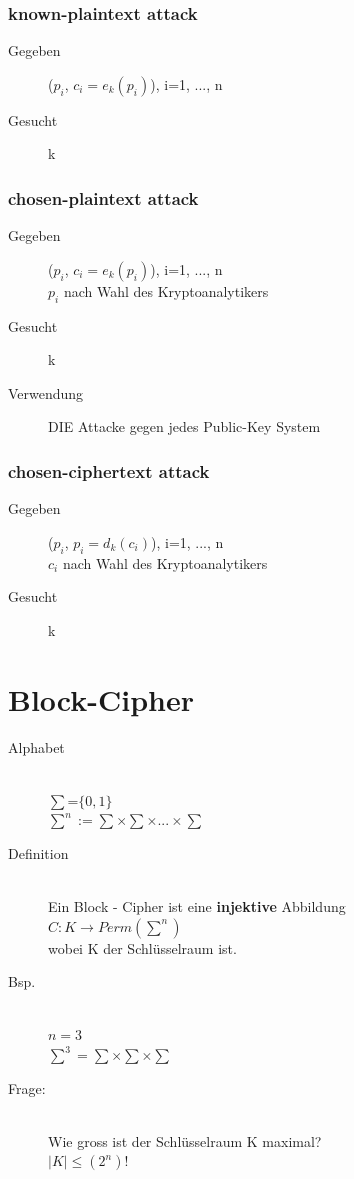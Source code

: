 \documentclass[10pt]{article}
\newcommand{\ra}{\rightarrow}
\begin{document}
\subsubsection{known-plaintext attack}
\begin{description}
	\item[Gegeben] ($p_i$, $c_i=e_k(p_i)$), i=1, ..., n
	\item[Gesucht] k
\end{description}

\subsubsection{chosen-plaintext attack}
\begin{description}
	\item[Gegeben] ($p_i$, $c_i=e_k(p_i)$), i=1, ..., n \\
		$p_i$ nach Wahl des Kryptoanalytikers
	\item[Gesucht] k
	\item[Verwendung] DIE Attacke gegen jedes Public-Key System
\end{description}

\subsubsection{chosen-ciphertext attack}
\begin{description}
	\item[Gegeben] ($p_i$, $p_i=d_k(c_i)$), i=1, ..., n \\
		$c_i$ nach Wahl des Kryptoanalytikers
	\item[Gesucht] k
\end{description}

\newpage
\section{Block-Cipher}
\begin{description}
	\item[Alphabet] \hfill \\
		$\sum$=$\{0,1\}$ \\
		$\sum^n := \sum \times \sum \times ... \times \sum$ 
	\item[Definition] \hfill \\
		Ein Block - Cipher ist eine \textbf{injektive} Abbildung \\
		$C: K \ra Perm(\sum^n)$ \\
		wobei K der Schlüsselraum ist.
	\item[Bsp.] \hfill \\
		$n=3$ \\
		$\sum^3=\sum \times \sum \times \sum$
	\item[Frage:] \hfill \\
		Wie gross ist der Schlüsselraum K maximal? \\
		$|K| \leq (2^n)!$
\end{description}
\end{document}
